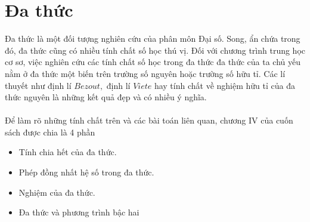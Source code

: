 \chapter{Đa thức}

Đa thức là một đối tượng nghiên cứu của phân môn Đại số. Song, ẩn chứa trong đó, đa thức cũng có nhiều tính chất số học thú vị. Đối với chương trình trung học cơ sơ, việc nghiên cứu các tính chất số học trong đa thức đa thức của ta chủ yếu nằm ở đa thức một biến trên trường số nguyên hoặc trường số hữu tỉ. Các lí thuyết  như định lí $Bezout,$ định lí $Viete$ hay tính chất về nghiệm hữu tỉ của đa thức nguyên là những kết quả đẹp và có nhiều ý nghĩa.\\ \\
Để làm rõ những tính chất trên và các bài toán liên quan, chương IV của cuốn sách được chia là 4 phần
\begin{itemize}
    \item{} Tính chia hết của đa thức.
    \item{} Phép đồng nhất hệ số trong đa thức.
    \item{} Nghiệm của đa thức.
    \item{} Đa thức và phương trình bậc hai
\end{itemize}

